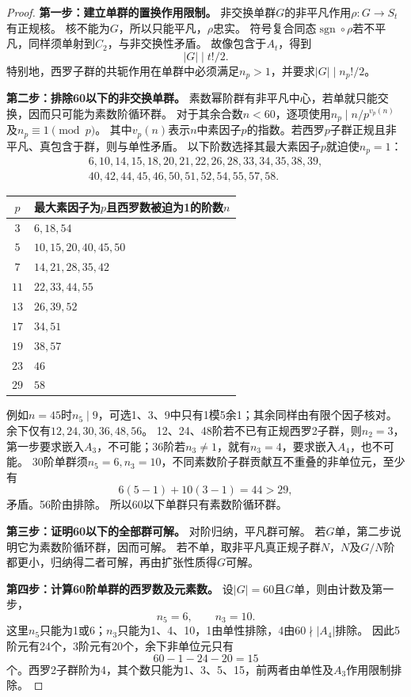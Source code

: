 \begin{proof}
\textbf{第一步：建立单群的置换作用限制。}
非交换单群$G$的非平凡作用$\rho:G\to S_t$有正规核。
核不能为$G$，所以只能平凡，$\rho$忠实。
符号复合同态$\operatorname{sgn}\circ\rho$若不平凡，同样须单射到$C_2$，与非交换性矛盾。
故像包含于$A_t$，得到
\[
|G|\mid t!/2.
\]
特别地，西罗子群的共轭作用在单群中必须满足$n_p>1$，并要求$|G|\mid n_p!/2$。

\textbf{第二步：排除60以下的非交换单群。}
素数幂阶群有非平凡中心，若单就只能交换，因而只可能为素数阶循环群。
对于其余合数$n<60$，逐项使用$n_p\mid n/p^{v_p(n)}$及$n_p\equiv1\pmod p$。
其中$v_p(n)$表示$n$中素因子$p$的指数。若西罗$p$子群正规且非平凡、真包含于群，则与单性矛盾。
以下阶数选择其最大素因子$p$就迫使$n_p=1$：
\[
\begin{gathered}
6,10,14,15,18,20,21,22,26,28,33,34,35,38,39,\\
40,42,44,45,46,50,51,52,54,55,57,58.
\end{gathered}
\]

\begin{center}\begin{tabular}{c|p{11cm}}
$p$ & 最大素因子为$p$且西罗数被迫为1的阶数$n$\\\hline
$3$ & $6,18,54$\\
$5$ & $10,15,20,40,45,50$\\
$7$ & $14,21,28,35,42$\\
$11$ & $22,33,44,55$\\
$13$ & $26,39,52$\\
$17$ & $34,51$\\
$19$ & $38,57$\\
$23$ & $46$\\
$29$ & $58$\\
\end{tabular}\end{center}
例如$n=45$时$n_5\mid9$，可选1、3、9中只有1模5余1；其余同样由有限个因子核对。
余下仅有$12,24,30,36,48,56$。
12、24、48阶若不已有正规西罗2子群，则$n_2=3$，第一步要求嵌入$A_3$，不可能；36阶若$n_3\neq1$，就有$n_3=4$，要求嵌入$A_4$，也不可能。
30阶单群须$n_5=6,n_3=10$，不同素数阶子群贡献互不重叠的非单位元，至少有
\[
6(5-1)+10(3-1)=44>29,
\]
矛盾。56阶由排除。
所以60以下单群只有素数阶循环群。

\textbf{第三步：证明60以下的全部群可解。}
对阶归纳，平凡群可解。
若$G$单，第二步说明它为素数阶循环群，因而可解。
若不单，取非平凡真正规子群$N$，$N$及$G/N$阶都更小，归纳得二者可解，再由扩张性质得$G$可解。

\textbf{第四步：计算60阶单群的西罗数及元素数。}
设$|G|=60$且$G$单，则由计数及第一步，
\[
n_5=6,\qquad n_3=10.
\]
这里$n_5$只能为1或6；$n_3$只能为1、4、10，1由单性排除，4由$60\nmid|A_4|$排除。
因此5阶元有24个，3阶元有20个，余下非单位元只有
\[
60-1-24-20=15
\]
个。西罗2子群阶为4，其个数只能为1、3、5、15，前两者由单性及$A_3$作用限制排除。


\end{proof}
